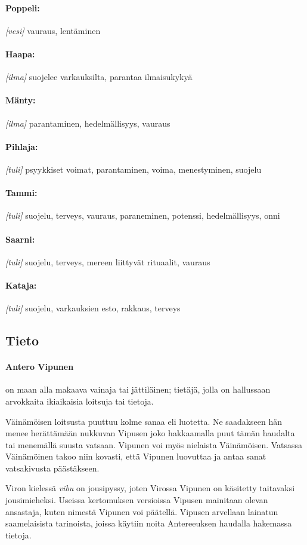   \paragraph{Poppeli:} \emph{[vesi]} vauraus, lentäminen
  \paragraph{Haapa:} \emph{[ilma]} suojelee varkauksilta, parantaa ilmaisukykyä
  \paragraph{Mänty:} \emph{[ilma]} parantaminen, hedelmällisyys, vauraus
  \paragraph{Pihlaja:} \emph{[tuli]} psyykkiset voimat, parantaminen, voima, menestyminen, suojelu
  \paragraph{Tammi:} \emph{[tuli]} suojelu, terveys, vauraus, paraneminen, potenssi,
    hedelmällisyys, onni
  \paragraph{Saarni:} \emph{[tuli]} suojelu, terveys, mereen liittyvät rituaalit, vauraus
  \paragraph{Kataja:} \emph{[tuli]} suojelu, varkauksien esto, rakkaus, terveys


\subsection{Tieto}

  \paragraph{Antero Vipunen} on maan alla makaava vainaja tai jättiläinen; tietäjä, jolla on
    hallussaan arvokkaita ikiaikaisia loitsuja tai tietoja.
    \par
    Väinämöisen loitsusta puuttuu kolme sanaa eli luotetta. Ne saadakseen hän menee herättämään
    nukkuvan Vipusen joko hakkaamalla puut tämän haudalta tai menemällä suusta vatsaan. Vipunen
    voi myös nielaista Väinämöisen. Vatsassa Väinämöinen takoo niin kovasti, että Vipunen
    luovuttaa ja antaa sanat vatsakivusta päästäkseen.
    \par
    Viron kielessä \emph{vibu} on jousipyssy, joten Virossa Vipunen on käsitetty taitavaksi
    jousimieheksi. Useissa kertomuksen versioissa Vipusen mainitaan olevan ansastaja, kuten
    nimestä Vipunen voi päätellä. Vipusen arvellaan lainatun saamelaisista tarinoista, joissa
    käytiin noita Antereeuksen haudalla hakemassa tietoja.
